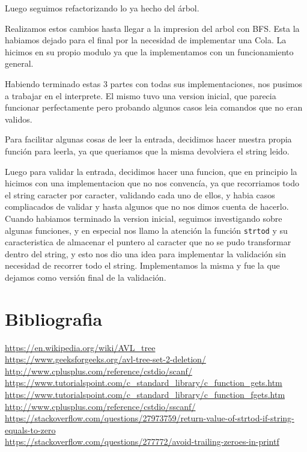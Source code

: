 \documentclass[]{article}
\begin{document}
Luego seguimos refactorizando lo ya hecho del árbol.

Realizamos estos cambios hasta llegar a la impresion del arbol con BFS. Esta la habiamos dejado para el final por la necesidad de implementar una Cola. La hicimos en su propio modulo ya que la implementamos con un funcionamiento general.

Habiendo terminado estas 3 partes con todas sus implementaciones, nos pusimos a trabajar en el interprete. El mismo tuvo una version inicial, que parecia funcionar perfectamente pero probando algunos casos leia comandos que no eran validos.

Para facilitar algunas cosas de leer la entrada, decidimos hacer nuestra propia función para leerla, ya que queriamos que la misma devolviera el string leido.

Luego para validar la entrada, decidimos hacer una funcion, que en principio la hicimos con una implementacion que no nos convencía, ya que recorriamos todo el string caracter por caracter, validando cada uno de ellos, y habia casos compliacados de validar y hasta algunos que no nos dimos cuenta de hacerlo. Cuando habiamos terminado la version inicial, seguimos investigando sobre algunas funciones, y en especial nos llamo la atención la función \verb|strtod| y su caracteristica de almacenar el puntero al caracter que no se pudo transformar dentro del string, y esto nos dio una idea para implementar la validación sin necesidad de recorrer todo el string. Implementamos la misma y fue la que dejamos como versión final de la validación.
\newpage
\section{Bibliografia}
\url{https://en.wikipedia.org/wiki/AVL_tree}\\
\url{https://www.geeksforgeeks.org/avl-tree-set-2-deletion/}\\
\url{http://www.cplusplus.com/reference/cstdio/scanf/}\\
\url{https://www.tutorialspoint.com/c_standard_library/c_function_gets.htm}\\
\url{https://www.tutorialspoint.com/c_standard_library/c_function_fgets.htm}\\
\url{http://www.cplusplus.com/reference/cstdio/sscanf/}\\
\url{https://stackoverflow.com/questions/27973759/return-value-of-strtod-if-string-equals-to-zero}\\
\url{https://stackoverflow.com/questions/277772/avoid-trailing-zeroes-in-printf}\\
\end{document}
